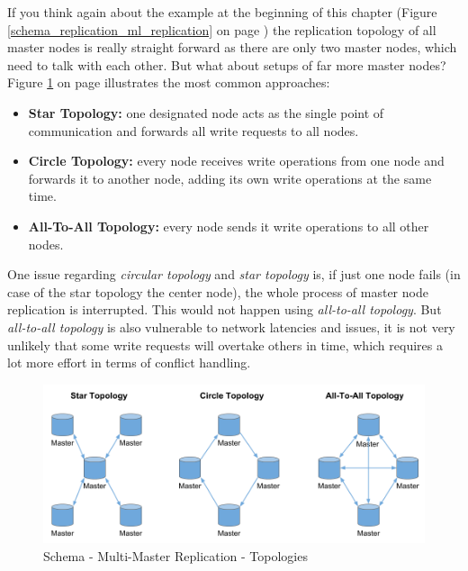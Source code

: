 {
If you think again about the example at the beginning of this chapter (Figure \ref{schema_replication_ml_replication} on page \pageref{schema_replication_ml_replication}) the replication topology of all master nodes is really straight forward as there are only two master nodes, which need to talk with each other. But what about setups of far more master nodes?
Figure \ref{schema_replication_ml_topologies} on page \pageref{schema_replication_ml_topologies} illustrates the most common approaches:\\
\begin{itemize}
\item \textbf{Star Topology:} one designated node acts as the single point of communication and forwards all write requests to all nodes.
\item \textbf{Circle Topology:} every node receives write operations from one node and forwards it to another node, adding its own write operations at the same time.
\item \textbf{All-To-All Topology:} every node sends it write operations to all other nodes.\\
\end{itemize} 

One issue regarding \textit{circular topology} and \textit{star topology} is, if just one node fails (in case of the star topology the center node), the whole process of master node replication is interrupted. This would not happen using \textit{all-to-all topology}. But \textit{all-to-all topology} is also vulnerable to network latencies and issues, it is not very unlikely that some write requests will overtake others in time, which requires a lot more effort in terms of conflict handling.

\begin{figure}[h]
	\centering
  \includegraphics[width=1\textwidth]{replication_schema_ml_topologies.png}
	\caption{Schema - Multi-Master Replication - Topologies}
	\label{schema_replication_ml_topologies}
\end{figure}

}
